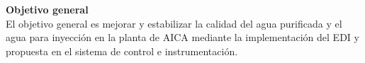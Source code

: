 \textbf{Objetivo general}\\
El objetivo general es mejorar y estabilizar la calidad del 
agua purificada y el agua para inyección en la planta de AICA 
mediante la implementación del EDI y propuesta en el sistema de control e instrumentación.

